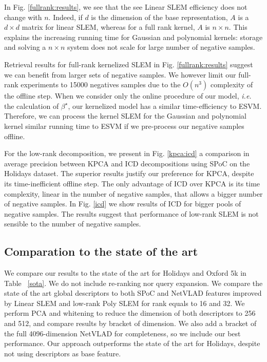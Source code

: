 In Fig. \ref{fullrank:results}, we see that the see Linear SLEM efficiency does not change with $n$.
Indeed, if $d$ is the dimension of the base representation, $A$ is a $d\times d$ matrix for linear SLEM, whereas for a full rank kernel, $A$ is $n\times n$.
This explains the increasing running time for Gaussian and polynomial kernels: storage and solving a $n\times n$ system does not scale for large number of negative samples.

Retrieval results for full-rank kernelized SLEM in Fig. \ref{fullrank:results} suggest we can benefit from larger sets of negative samples. We however limit our full-rank experiments to 15000 negatives samples due to the $O(n^3)$ complexity of the offline step.
When we consider only the online procedure of our model, \emph{i.e.} the calculation of $\beta^\star$, our kernelized model has a similar time-efficiency to ESVM. Therefore, we can process the kernel SLEM for the Gaussian and polynomial kernel similar running time to ESVM if we pre-process our negative samples offline.

For the low-rank decomposition, we present in Fig. \ref{kpca:icd} a comparison in average precision between KPCA and ICD decompositions using SPoC on the Holidays dataset. The superior results justify our preference for KPCA, despite its time-inefficient offline step. The only advantage of ICD over KPCA is its time complexity, linear in the number of negative samples, that allows a bigger number of negative samples. In Fig. \ref{icd} we show results of ICD for bigger pools of negative samples. The results suggest that performance of low-rank SLEM is not sensible to the number of negative samples.




\vspace{3 mm}



\subsection{Comparation to the state of the art}
We compare our results to the state of the art for Holidays and Oxford 5k in Table ~\ref{sota}.  We do not include re-ranking nor query expansion. We compare the state of the art global descriptors to both SPoC and NetVLAD features improved by Linear SLEM and low-rank Poly SLEM for rank equals to 16 and 32. We perform PCA and whitening to reduce the dimension of both descriptors to 256 and 512, and compare results by bracket of dimension. We also add a bracket of the full 4096-dimension NetVLAD for completeness, so we include our best performance. Our approach outperforms the state of the art for Holidays, despite not using descriptors as base feature.

